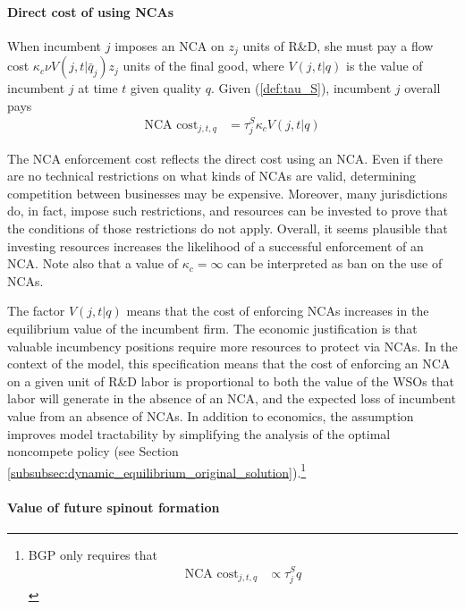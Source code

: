 \documentclass[11pt,english]{article}
\theoremstyle{remark}
\begin{document}
\paragraph{Direct cost of using NCAs}\label{paragraph:nca_cost}

When incumbent $j$ imposes an NCA on $z_j$ units of R\&D, she must pay a flow cost $\kappa_{c} \nu V(j,t|\bar{q}_j) z_j$ units of the final good, where $V(j,t|q)$ is the value of incumbent $j$ at time $t$ given quality $q$. Given (\ref{def:tau_S}), incumbent $j$ overall pays
\begin{align}
	\textrm{NCA cost}_{j,t,q} &= \tau^S_j \kappa_c V(j,t|q) \label{def:nca_cost}
\end{align}

The NCA enforcement cost reflects the direct cost using an NCA. Even if there are no technical restrictions on what kinds of NCAs are valid, determining competition between businesses may be expensive. Moreover, many jurisdictions do, in fact, impose such restrictions, and resources can be invested to prove that the conditions of those restrictions do not apply. Overall, it seems plausible that investing resources increases the likelihood of a successful enforcement of an NCA.  Note also that a value of $\kappa_c = \infty$ can be interpreted as ban on the use of NCAs.

The factor $V(j,t|q)$ means that the cost of enforcing NCAs increases in the equilibrium value of the incumbent firm. The economic justification is that valuable incumbency positions require more resources to protect via NCAs. In the context of the model, this specification means that the cost of enforcing an NCA on a given unit of R\&D labor is proportional to both the value of the WSOs that labor will generate in the absence of an NCA, and the expected loss of incumbent value from an absence of NCAs. In addition to economics, the assumption improves model tractability by simplifying the analysis of the optimal noncompete policy (see Section \ref{subsubsec:dynamic_equilibrium_original_solution}).\footnote{BGP only requires that\begin{align*}
	\textrm{NCA cost}_{j,t,q} &\propto \tau^S_j q
	\end{align*}}

\paragraph{Value of future spinout formation}
\end{document}
